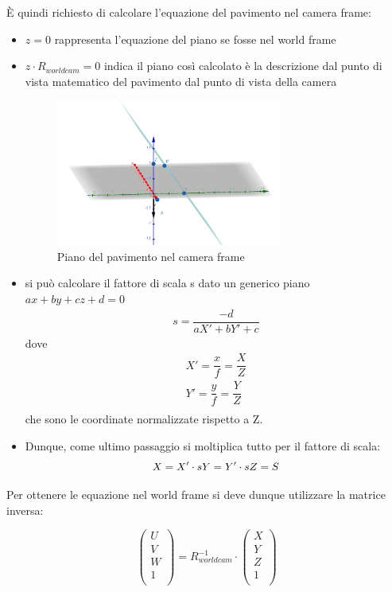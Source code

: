 È quindi richiesto di calcolare l'equazione del pavimento nel camera frame:
\begin{itemize}
	\item $z = 0$ rappresenta l'equazione del piano se fosse nel world frame
	\item $z \cdot R_{worldcam} = 0$ indica il piano così calcolato è la descrizione dal punto di vista matematico del pavimento dal punto di vista della camera
	\begin{figure}[H]
		\centering
		\includegraphics[width=0.7\textwidth]{Immagini/piano_camera.jpeg}
		\caption{Piano del pavimento nel camera frame}
		\label{fig:piano_camera}
	\end{figure}
	\item si può calcolare il fattore di scala s dato un generico piano $ax+by+cz+d=0$
		\begin{equation}
		\begin{split}
		s = \dfrac{-d}{aX'+bY'+c}	
		\end{split}
		\end{equation}
	dove
		\begin{equation}
		\begin{split}
		X'=\dfrac{x}{f}=\dfrac{X}{Z}\\
		Y'=\dfrac{y}{f}=\dfrac{Y}{Z} \\
		\end{split}
		\end{equation}
	che sono le coordinate normalizzate rispetto a Z.
	\item Dunque, come ultimo passaggio si moltiplica tutto per il fattore di scala:
		\begin{equation}
		X=X' \cdot s\\
		Y=Y' \cdot s\\
		Z=S
		\end{equation}
\end{itemize}

Per ottenere le equazione nel world frame si deve dunque utilizzare la matrice inversa:

$$
\begin{pmatrix}
U  \\
V  \\
W  \\
1  \\
\end{pmatrix}
=R_{worldcam}^{-1}\cdot
\begin{pmatrix}
X  \\
Y  \\
Z  \\
1  \\
\end{pmatrix}
$$
